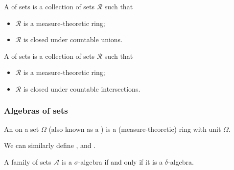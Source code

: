\begin{definition}
A  of sets is a collection of sets $\mathcal{R}$ such that
\begin{itemize}
\item $\mathcal{R}$ is a measure-theoretic ring;
\item $\mathcal{R}$ is closed under countable unions.
\end{itemize}
A  of sets is a collection of sets $\mathcal{R}$ such that
\begin{itemize}
\item $\mathcal{R}$ is a measure-theoretic ring;
\item $\mathcal{R}$ is closed under countable intersections.
\end{itemize}
\end{definition}

\subsubsection{Algebras of sets}
\begin{definition}
An  on a set $\Omega$ (also known as a ) is a (measure-theoretic) ring with unit $\Omega$.

We can similarly define ,  and .
\end{definition}

\begin{lemma}
A family of sets $\mathcal{A}$ is a $\sigma$-algebra \textup{if and only if} it is a $\delta$-algebra.
\end{lemma}

